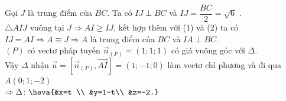 \begin{ex}
{		Gọi $J$ là trung điểm của $BC$. Ta có $I J \perp BC$ và $I J=\dfrac{BC}{2}=\sqrt{6}$ .\\		
		$\triangle AIJ$ vuông tại $J\Rightarrow AI\geq IJ$, kết hợp thêm với (1) và (2) ta có $IJ=AI\Rightarrow A\equiv J\Rightarrow A$ là trung điểm của $BC$ và $I A \perp BC$.\\
		$(P)$ có vectơ  pháp tuyến $\vec{n}_{(P)}=(1; 1; 1)$ có giá vuông góc với $\Delta$.\\
		Vậy $\Delta$ nhận $\vec{u}=\left[\vec{n}_{(P)}, \overrightarrow{AI}\right]=(1;-1; 0)$ làm vectơ  chỉ phương và đi qua $A(0; 1;-2)$\\
		$\Rightarrow \Delta\colon \heva{&x=t \\
			&y=1-t\\
			&z=-2.}$
	}
\end{ex}

